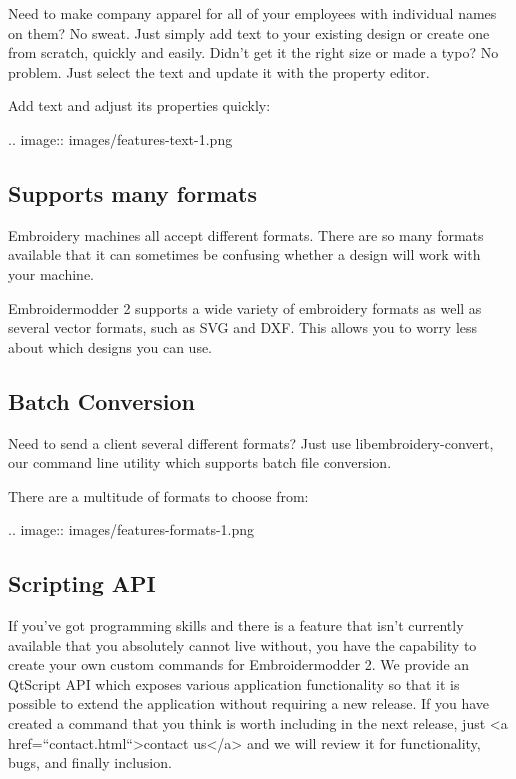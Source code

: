 \documentclass[a4paper]{report}
\begin{document}
Need to make company apparel for all of your employees with individual names on them? No sweat. Just simply add text to your existing design or create one from scratch, quickly and easily.
Didn't get it the right size or made a typo? No problem. Just select the text and update it with the property editor.

Add text and adjust its properties quickly:

.. image::
   images/features-text-1.png

\subsection{Supports many formats}

Embroidery machines all accept different formats. There are so many formats available that it can sometimes be confusing whether a design will work with your machine.

Embroidermodder 2 supports a wide variety of embroidery formats as well as several vector formats, such as SVG and DXF. This allows you to worry less about which designs you can use.

\subsection{Batch Conversion}

Need to send a client several different formats? Just use libembroidery-convert, our command line utility which supports batch file conversion.

There are a multitude of formats to choose from:

.. image::
   images/features-formats-1.png

\subsection{Scripting API}

If you've got programming skills and there is a feature that isn't currently available that you absolutely cannot live without, you have the capability to create your own custom commands for Embroidermodder 2. We provide an QtScript API which exposes various application functionality so that it is possible to extend the application without requiring a new release. If you have created a command that you think is worth including in the next release, just <a href=``contact.html``>contact us</a> and we will review it for functionality, bugs, and finally inclusion.
\end{document}
